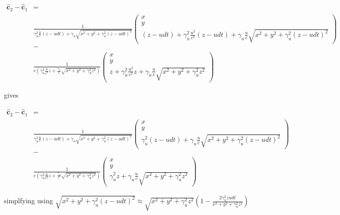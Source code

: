 \begin{equation}
	\begin{aligned}
	\mathbf{\hat{c}}_2 - \mathbf{\hat{c}}_1 &= \\
	& \frac{1}{ \gamma_u^2 \frac{u}{c} (z - u dt) + \gamma_u \sqrt{x^2 + y^2 + \gamma_u^2 (z - u dt)^2} }
	\begin{pmatrix}
		x \\
		y \\
		(z - u dt) + \gamma_u^2 \frac{u^2}{c^2} (z - u dt) + \gamma_u \frac{u}{c} \sqrt{x^2 + y^2 + \gamma_u^2 (z - u dt)^2}
	\end{pmatrix} \\
	&- \\
	&\frac{1}{c \left( \gamma_u^2 \frac{u}{c^2}z + \frac{\gamma_u}{c} \sqrt{x^2 + y^2 + \gamma_u^2 z^2} \right)}
	\begin{pmatrix}
		x \\
		y \\
		z +  \gamma_u^2 \frac{u^2}{c^2}z + \gamma_u \frac{u}{c} \sqrt{x^2 + y^2 + \gamma_u^2 z^2}
	\end{pmatrix}
	\end{aligned}
\end{equation}

gives

\begin{equation}
	\begin{aligned}
	\mathbf{\hat{c}}_2 - \mathbf{\hat{c}}_1 &= \\
	& \frac{1}{ \gamma_u^2 \frac{u}{c} (z - u dt) + \gamma_u \sqrt{x^2 + y^2 + \gamma_u^2 (z - u dt)^2} }
	\begin{pmatrix}
		x \\
		y \\
		\gamma_u^2 (z - u dt) + \gamma_u \frac{u}{c} \sqrt{x^2 + y^2 + \gamma_u^2 (z - u dt)^2}
	\end{pmatrix} \\
	&- \\
	&\frac{1}{c \left( \gamma_u^2 \frac{u}{c^2}z + \frac{\gamma_u}{c} \sqrt{x^2 + y^2 + \gamma_u^2 z^2} \right)}
	\begin{pmatrix}
		x \\
		y \\
		\gamma_u^2 z + \gamma_u \frac{u}{c} \sqrt{x^2 + y^2 + \gamma_u^2 z^2}
	\end{pmatrix}
	\end{aligned}
\end{equation}

simplfying using $ \sqrt{x^2 + y^2 + \gamma_u^2 (z - u dt)^2} \approx \sqrt{x^2 + y^2 + \gamma_u^2 z^2} (1 - \frac{2\gamma_u^2 z u dt}{x^2 + y^2 + \gamma_u^2 z^2}) $

